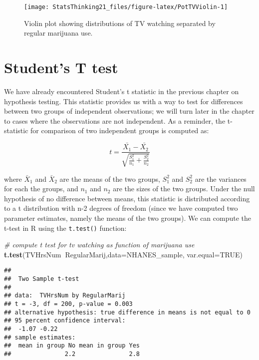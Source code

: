 \documentclass[]{book}
\newenvironment{Shaded}{\begin{snugshade}}{\end{snugshade}}
\newcommand{\KeywordTok}[1]{\textcolor[rgb]{0.13,0.29,0.53}{\textbf{#1}}}
\newcommand{\DataTypeTok}[1]{\textcolor[rgb]{0.13,0.29,0.53}{#1}}
\newcommand{\CommentTok}[1]{\textcolor[rgb]{0.56,0.35,0.01}{\textit{#1}}}
\newcommand{\OtherTok}[1]{\textcolor[rgb]{0.56,0.35,0.01}{#1}}
\newcommand{\OperatorTok}[1]{\textcolor[rgb]{0.81,0.36,0.00}{\textbf{#1}}}
\newcommand{\NormalTok}[1]{#1}
\theoremstyle{definition}
\theoremstyle{definition}
\theoremstyle{definition}
\theoremstyle{remark}
\begin{document}
\begin{figure}
\texttt{[image: StatsThinking21\_files/figure-latex/PotTVViolin-1]} \caption{Violin plot showing distributions of TV watching separated by regular marijuana use.}\label{fig:PotTVViolin}
\end{figure}

\section{Student's T test}\label{students-t-test}

We have already encountered Student's t statistic in the previous
chapter on hypothesis testing. This statistic provides us with a way to
test for differences between two groups of independent observations; we
will turn later in the chapter to cases where the observations are not
independent. As a reminder, the t-statistic for comparison of two
independent groups is computed as:

\[
t = \frac{\bar{X_1} - \bar{X_2}}{\sqrt{\frac{S_1^2}{n_1} + \frac{S_2^2}{n_2}}}
\]

where \(\bar{X}_1\) and \(\bar{X}_2\) are the means of the two groups,
\(S^2_1\) and \(S^2_2\) are the variances for each the groups, and
\(n_1\) and \(n_2\) are the sizes of the two groups. Under the null
hypothesis of no difference between means, this statistic is distributed
according to a t distribution with n-2 degrees of freedom (since we have
computed two parameter estimates, namely the means of the two groups).
We can compute the t-test in R using the \texttt{t.test()} function:

\begin{Shaded}
\begin{Highlighting}[]
\CommentTok{# compute t test for tv watching as function of marijuana use}
\KeywordTok{t.test}\NormalTok{(TVHrsNum}\OperatorTok{~}\NormalTok{RegularMarij,}\DataTypeTok{data=}\NormalTok{NHANES_sample,}
       \DataTypeTok{var.equal=}\OtherTok{TRUE}\NormalTok{)}
\end{Highlighting}
\end{Shaded}

\begin{verbatim}
## 
##  Two Sample t-test
## 
## data:  TVHrsNum by RegularMarij
## t = -3, df = 200, p-value = 0.003
## alternative hypothesis: true difference in means is not equal to 0
## 95 percent confidence interval:
##  -1.07 -0.22
## sample estimates:
##  mean in group No mean in group Yes 
##               2.2               2.8
\end{verbatim}
\end{document}
